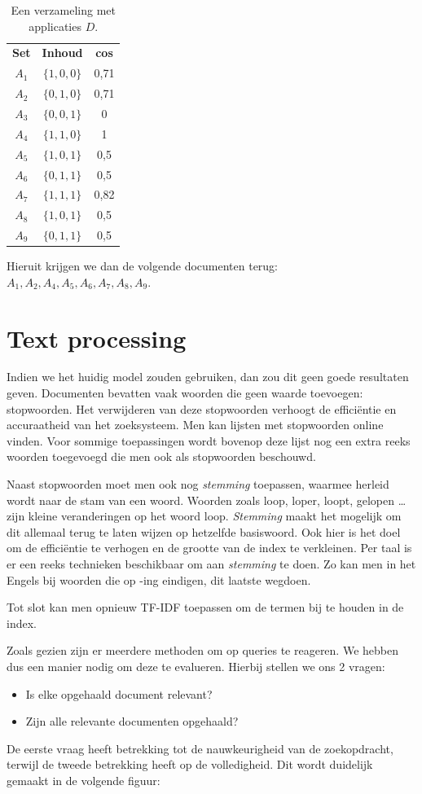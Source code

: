 \begin{table}[h]
\centering
\caption{Een verzameling met applicaties $D$.}
\label{tabel:sl_ex1}
\begin{tabular}{c|c|c}
\textbf{Set} & \textbf{Inhoud} & \textbf{cos} \\
$A_1$ & $\{1,0,0\}$ & 0,71 \\
$A_2$ & $\{0,1,0\}$ & 0,71\\
$A_3$ & $\{0,0,1\}$ & 0\\
$A_4$ & $\{1,1,0\}$ & 1\\
$A_5$ & $\{1,0,1\}$ & 0,5\\
$A_6$ & $\{0,1,1\}$ & 0,5\\
$A_7$ & $\{1,1,1\}$ & 0,82\\
$A_8$ & $\{1,0,1\}$ & 0,5\\
$A_9$ & $\{0,1,1\}$ & 0,5\\
\end{tabular}
\end{table}

Hieruit krijgen we dan de volgende documenten terug: $A_1,A_2,A_4,A_5,A_6,A_7,A_8,A_9$.

\section{Text processing}
Indien we het huidig model zouden gebruiken, dan zou dit geen goede resultaten geven. Documenten bevatten vaak woorden die geen waarde toevoegen: stopwoorden. Het verwijderen van deze stopwoorden verhoogt de effici\"entie en accuraatheid van het zoeksysteem. Men kan lijsten met stopwoorden online vinden. Voor sommige toepassingen wordt bovenop deze lijst nog een extra reeks woorden toegevoegd die men ook als stopwoorden beschouwd. 

Naast stopwoorden moet men ook nog \emph{stemming} toepassen, waarmee herleid wordt naar de stam van een woord. Woorden zoals loop, loper, loopt, gelopen \dots zijn kleine veranderingen op het woord loop. \emph{Stemming} maakt het mogelijk om dit allemaal terug te laten wijzen op hetzelfde basiswoord. Ook hier is het doel om de effici\"entie te verhogen en de grootte van de index te verkleinen. Per taal is er een reeks technieken beschikbaar om aan \emph{stemming} te doen. Zo kan men in het Engels bij woorden die op -ing eindigen, dit laatste wegdoen.

Tot slot kan men opnieuw TF-IDF toepassen om de termen bij te houden in de index.

Zoals gezien zijn er meerdere methoden om op queries te reageren. We hebben dus een manier nodig om deze te evalueren. Hierbij stellen we ons 2 vragen:
\begin{itemize}
\item Is elke opgehaald document relevant?
\item Zijn alle relevante documenten opgehaald?
\end{itemize}
De eerste vraag heeft betrekking tot de nauwkeurigheid van de zoekopdracht, terwijl de tweede betrekking heeft op de volledigheid. Dit wordt duidelijk gemaakt in de volgende figuur:

